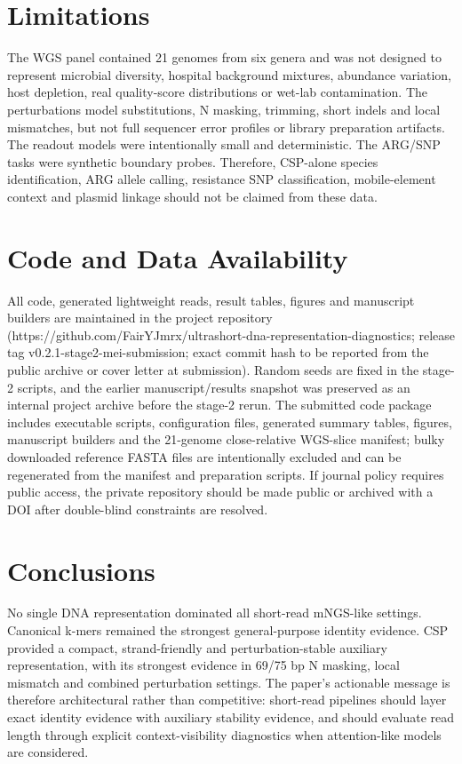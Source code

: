 \documentclass[10.5pt]{article}
\begin{document}
\section*{Limitations}

The WGS panel contained 21 genomes from six genera and was not designed to represent microbial diversity, hospital background mixtures, abundance variation, host depletion, real quality-score distributions or wet-lab contamination. The perturbations model substitutions, N masking, trimming, short indels and local mismatches, but not full sequencer error profiles or library preparation artifacts. The readout models were intentionally small and deterministic. The ARG/SNP tasks were synthetic boundary probes. Therefore, CSP-alone species identification, ARG allele calling, resistance SNP classification, mobile-element context and plasmid linkage should not be claimed from these data.


\section*{Code and Data Availability}

All code, generated lightweight reads, result tables, figures and manuscript builders are maintained in the project repository (https://github.com/FairYJmrx/ultrashort-dna-representation-diagnostics; release tag v0.2.1-stage2-mei-submission; exact commit hash to be reported from the public archive or cover letter at submission). Random seeds are fixed in the stage-2 scripts, and the earlier manuscript/results snapshot was preserved as an internal project archive before the stage-2 rerun. The submitted code package includes executable scripts, configuration files, generated summary tables, figures, manuscript builders and the 21-genome close-relative WGS-slice manifest; bulky downloaded reference FASTA files are intentionally excluded and can be regenerated from the manifest and preparation scripts. If journal policy requires public access, the private repository should be made public or archived with a DOI after double-blind constraints are resolved.


\section*{Conclusions}

No single DNA representation dominated all short-read mNGS-like settings. Canonical k-mers remained the strongest general-purpose identity evidence. CSP provided a compact, strand-friendly and perturbation-stable auxiliary representation, with its strongest evidence in 69/75 bp N masking, local mismatch and combined perturbation settings. The paper's actionable message is therefore architectural rather than competitive: short-read pipelines should layer exact identity evidence with auxiliary stability evidence, and should evaluate read length through explicit context-visibility diagnostics when attention-like models are considered.
\end{document}
